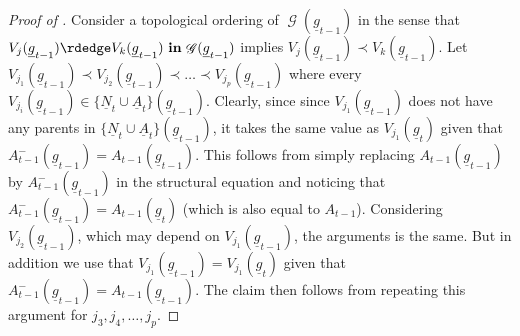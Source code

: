 \documentclass[12pt,a4paper]{article}
\theoremstyle{definition}
\newcommand{\ingraph}[1]{~\textnormal{\bf in}\,#1}
\DeclareMathOperator{\gG}{\mathscr{G}}
\begin{document}
\begin{proof}[Proof of ]
  Consider a topological ordering of $\gG(\underline{g}_{t-1})$ in the sense that $V_{j}(\underline{g}_{t-1}) \rdedge V_k(\underline{g}_{t-1}) \ingraph{\gG(\underline{g}_{t-1})}$ implies $V_j(\underline{g}_{t-1}) \prec V_k(\underline{g}_{t-1})$. Let $V_{j_1}(\underline{g}_{t-1}) \prec V_{j_2}(\underline{g}_{t-1}) \prec \dots \prec V_{j_p}(\underline{g}_{t-1})$ where every $V_{j_i}(\underline{g}_{t-1}) \in \{\underline{N}_t\cup \underline{A}_t\}(\underline{g}_{t-1})$. Clearly, since since $V_{j_1}(\underline{g}_{t-1})$ does not have any parents in $\{\underline{N}_t\cup \underline{A}_t\}(\underline{g}_{t-1})$, it takes the same value as $V_{j_1}(\underline{g}_{t})$ given that $A_{t-1}^{-}(\underline{g}_{t-1}) = A_{t-1}(\underline{g}_{t-1})$. This follows from simply replacing $A_{t-1}(\underline{g}_{t-1})$ by $A_{t-1}^{-}(\underline{g}_{t-1})$ in the structural equation and noticing that $A_{t-1}^{-}(\underline{g}_{t-1}) = A_{t-1}(\underline{g}_{t})$ (which is also equal to $A_{t-1}$). Considering $V_{j_2}(\underline{g}_{t-1})$, which may depend on $V_{j_1}(\underline{g}_{t-1})$, the arguments is the same. But in addition we use that $V_{j_1}(\underline{g}_{t-1}) = V_{j_1}(\underline{g}_{t})$ given that $A_{t-1}^{-}(\underline{g}_{t-1}) = A_{t-1}(\underline{g}_{t-1})$. The claim then follows from repeating this argument for $j_3, j_4, \dots, j_p$.
\end{proof}
\end{document}
